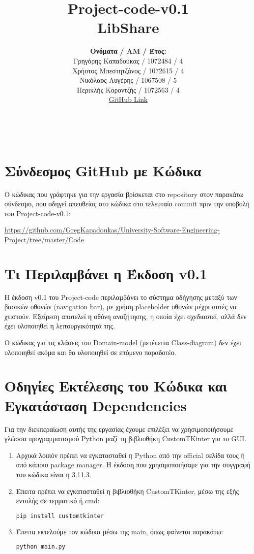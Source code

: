 \documentclass[12pt,a4paper]{article}
\title{Project-code-v0.1 \\ LibShare}
\author{\textbf{Ονόματα / ΑΜ / Έτος:} \\ Γρηγόρης Καπαδούκας / 1072484 / 4\textdegree \\ Χρήστος Μπεστητζάνος / 1072615 / 4\textdegree \\ Νικόλαος Αυγέρης / 1067508 / 5\textdegree \\ Περικλής Κοροντζής / 1072563 / 4\textdegree\\ \href{https://github.com/GregKapadoukas/University-Software-Engineering-Project}{\color{blue}GitHub Link}}
\begin{document}
\makeatletter
\begin{center}
	\LARGE{\@title} \\
	\pagebreak
    \begin{LARGE}\@author\end{LARGE}
    \pagebreak
\end{center}

\section{Σύνδεσμος GitHub με Κώδικα}
Ο κώδικας που γράφτηκε για την εργασία βρίσκεται στο repository στον παρακάτω σύνδεσμο, που οδηγεί απευθείας στο κώδικα στο τελευταίο commit πριν την υποβολή του Project-code-v0.1:

\textcolor{blue}{\href{https://github.com/GregKapadoukas/University-Software-Engineering-Project/tree/master/Code}{https://github.com/GregKapadoukas/University-Software-Engineering-\\Project/tree/master/Code}}

\section{Τι Περιλαμβάνει η Έκδοση v0.1}

Η έκδοση v0.1 του Project-code περιλαμβάνει το σύστημα οδήγησης μεταξύ των βασικών οθονών (navigation bar), με χρήση placeholder οθονών μέχρι αυτές να χτιστούν. Εξαίρεση αποτελεί η οθόνη αναζήτησης, η οποία έχει σχεδιαστεί, αλλά δεν έχει υλοποιηθεί η λειτουργικότητά της.

Ο κώδικας για τις κλάσεις του Domain-model (μετέπειτα Class-diagram) δεν έχει υλοποιηθεί ακόμα και θα υλοποιηθεί σε επόμενο παραδοτέο.

\section{Οδηγίες Εκτέλεσης του Κώδικα και Εγκατάσταση Dependencies}
Για την διεκπεραίωση αυτής της εργασίας έχουμε επιλέξει να χρησιμοποιήσουμε γλώσσα προγραμματισμού Python μαζί τη βιβλιοθήκη CustomTKinter για το GUI.

\begin{enumerate}
    \item Αρχικά λοιπόν πρέπει να εγκατασταθεί η Python από την official σελίδα τους ή από κάποιο package manager. Η έκδοση που χρησιμοποιήσαμε για την συγγραφή του κώδικα είναι η 3.11.3.

    \item Έπειτα πρέπει να εγκατασταθεί η βιβλιοθήκη CustomTKinter, μέσω της εξής εντολής σε τερματικό ή cmd:

\begin{lstlisting}[language=Bash]
pip install customtkinter\end{lstlisting}

    \item Έπειτα εκτελούμε τον κώδικα μέσω της main, όπως φαίνεται παρακάτω:

\begin{lstlisting}[language=Bash]
python main.py\end{lstlisting}
\end{enumerate}
\end{document}
